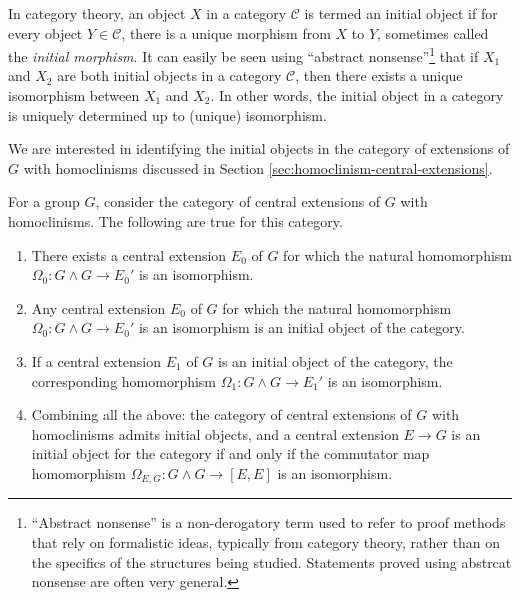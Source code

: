 \documentclass{ucetd}
\begin{document}
In category theory, an object $X$ in a category $\mathcal{C}$ is
termed an initial object if for every object $Y \in \mathcal{C}$,
there is a unique morphism from $X$ to $Y$, sometimes called the {\em
  initial morphism}. It can easily be seen using ``abstract
nonsense''\footnote{``Abstract nonsense'' is a non-derogatory term
  used to refer to proof methods that rely on formalistic ideas,
  typically from category theory, rather than on the specifics of the
  structures being studied. Statements proved using abstrcat nonsense
  are often very general.} that if $X_1$ and $X_2$ are both initial
  objects in a category $\mathcal{C}$, then there exists a unique
  isomorphism between $X_1$ and $X_2$. In other words, the initial
  object in a category is uniquely determined up to (unique)
  isomorphism.

We are interested in identifying the initial objects in the category
of extensions of $G$ with homoclinisms discussed in Section
\ref{sec:homoclinism-central-extensions}.

\begin{lemma}\label{lemma:initobj}
  For a group $G$, consider the category of central extensions of $G$
  with homoclinisms. The following are true for this category.
  \begin{enumerate}
  \item There exists a central extension $E_0$ of $G$ for which the
    natural homomorphism $\Omega_0: G \wedge G \to E_0'$ is an isomorphism.
  \item Any central extension $E_0$ of $G$ for which the natural
    homomorphism $\Omega_0:G \wedge G \to E_0'$ is an isomorphism is
    an initial object of the category.
  \item If a central extension $E_1$ of $G$ is an initial object of
    the category, the corresponding homomorphism $\Omega_1:G \wedge G
    \to E_1'$ is an isomorphism.
  \item Combining all the above: the category of central extensions of
    $G$ with homoclinisms admits initial objects, and a central
    extension $E \to G$ is an initial object for the category if and
    only if the commutator map homomorphism $\Omega_{E,G}: G \wedge G
    \to [E,E]$ is an isomorphism.
  \end{enumerate}
\end{lemma}
\end{document}

